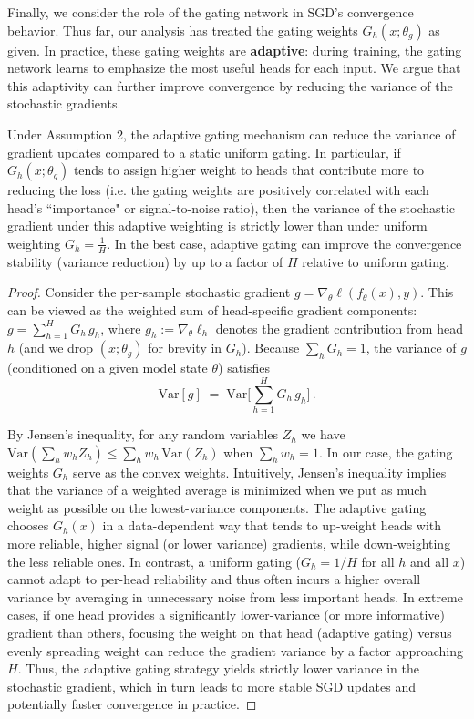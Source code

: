 \documentclass{article} %
\begin{document}
Finally, we consider the role of the gating network in SGD's convergence behavior. Thus far, our analysis has treated the gating weights $G_h(x;\theta_g)$ as given. In practice, these gating weights are \textbf{adaptive}: during training, the gating network learns to emphasize the most useful heads for each input. We argue that this adaptivity can further improve convergence by reducing the variance of the stochastic gradients.

\begin{proposition}
Under Assumption 2, the adaptive gating mechanism can reduce the variance of gradient updates compared to a static uniform gating. In particular, if $G_h(x;\theta_g)$ tends to assign higher weight to heads that contribute more to reducing the loss (i.e. the gating weights are positively correlated with each head's ``importance" or signal-to-noise ratio), then the variance of the stochastic gradient under this adaptive weighting is strictly lower than under uniform weighting $G_h = \frac{1}{H}$. In the best case, adaptive gating can improve the convergence stability (variance reduction) by up to a factor of $H$ relative to uniform gating.
\end{proposition}

\begin{proof}[Proof]
Consider the per-sample stochastic gradient $g = \nabla_{\!\theta}\ell(f_\theta(x),y)$. This can be viewed as the weighted sum of head-specific gradient components: $g = \sum_{h=1}^H G_h\, g_h$, where $g_h := \nabla_{\!\theta}\ell_h$ denotes the gradient contribution from head $h$ (and we drop $(x;\theta_g)$ for brevity in $G_h$). Because $\sum_h G_h = 1$, the variance of $g$ (conditioned on a given model state $\theta$) satisfies 
\begin{equation}
\mathrm{Var}[g] \;=\; \mathrm{Var}\Big[\sum_{h=1}^H G_h\,g_h\Big]\,.
\end{equation}

By Jensen's inequality, for any random variables $Z_h$ we have $\mathrm{Var}(\sum_h w_h Z_h) \le \sum_h w_h\,\mathrm{Var}(Z_h)$ when $\sum_h w_h = 1$. In our case, the gating weights $G_h$ serve as the convex weights. Intuitively, Jensen's inequality implies that the variance of a weighted average is minimized when we put as much weight as possible on the lowest-variance components. The adaptive gating chooses $G_h(x)$ in a data-dependent way that tends to up-weight heads with more reliable, higher signal (or lower variance) gradients, while down-weighting the less reliable ones. In contrast, a uniform gating ($G_h = 1/H$ for all $h$ and all $x$) cannot adapt to per-head reliability and thus often incurs a higher overall variance by averaging in unnecessary noise from less important heads. In extreme cases, if one head provides a significantly lower-variance (or more informative) gradient than others, focusing the weight on that head (adaptive gating) versus evenly spreading weight can reduce the gradient variance by a factor approaching $H$. Thus, the adaptive gating strategy yields strictly lower variance in the stochastic gradient, which in turn leads to more stable SGD updates and potentially faster convergence in practice.
\end{proof}
\end{document}
